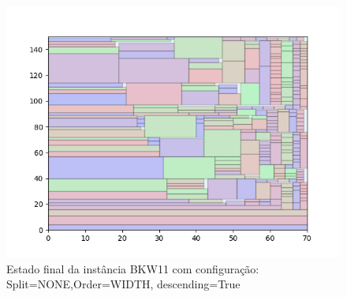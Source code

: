 \begin{figure}[H]
    \centering
    \caption[]{Estado final da instância BKW11 com configuração: Split=NONE,Order=WIDTH, descending=True}
    \label{fig:bkw11-none-width-true}
    \includegraphics[scale=0.5]{output/figures/bkw/bkw11/none/width/true/000}
\end{figure}